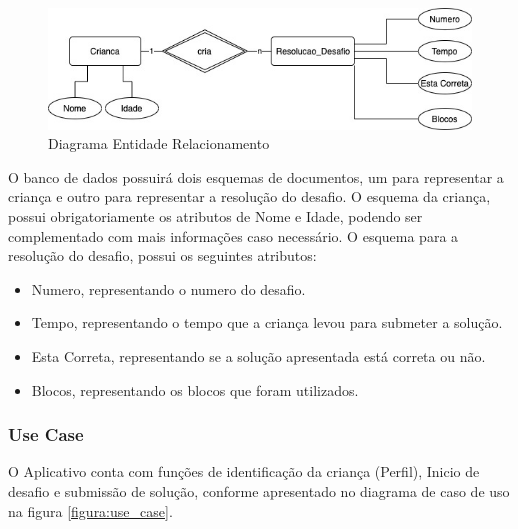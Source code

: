         \begin{figure}[H]
            \caption{Diagrama Entidade Relacionamento}
            \begin{center}
                \includegraphics[width=\linewidth]{Imagens/cap3/MER_DER.jpg}
            \end{center}
            \label{figura:der_mer}
        \end{figure}
        
        O banco de dados possuirá dois esquemas de documentos, um para representar a criança e outro para representar a resolução do desafio.
        O esquema da criança, possui obrigatoriamente os atributos de Nome e Idade, podendo ser complementado com mais informações caso necessário.
        O esquema para a resolução do desafio, possui os seguintes atributos:
        
        \begin{itemize}
            \item Numero, representando o numero do desafio.
            \item Tempo, representando o tempo que a criança levou para submeter a solução.
            \item Esta Correta, representando se a solução apresentada está correta ou não.
            \item Blocos, representando os blocos que foram utilizados.
        \end{itemize} 
        
        \subsubsection{Use Case}
        O Aplicativo conta com funções de identificação da criança (Perfil), Inicio de desafio e submissão de solução, conforme apresentado no diagrama de caso de uso na figura \ref{figura:use_case}.
        
